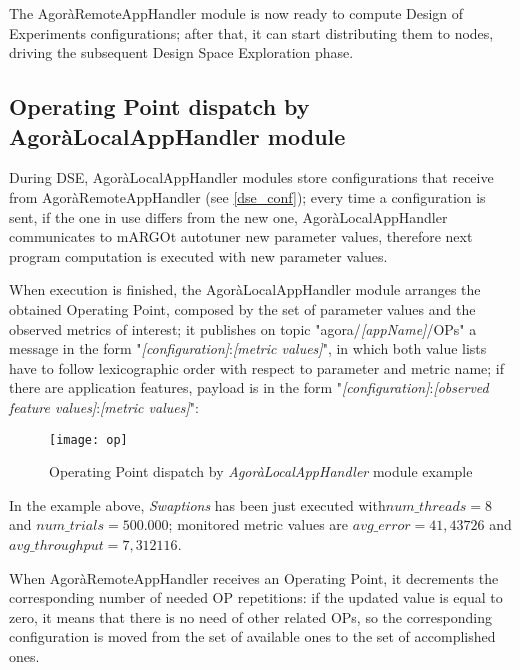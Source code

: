 The AgoràRemoteAppHandler module is now ready to compute Design of Experiments configurations; after that, it can start distributing them to nodes, driving the subsequent Design Space Exploration phase.





\subsection{Operating Point dispatch by AgoràLocalAppHandler module}\label{opSend}

During DSE, AgoràLocalAppHandler modules store configurations that receive from AgoràRemoteAppHandler (see \ref{dse_conf}); every time a configuration is sent, if the one in use differs from the new one, AgoràLocalAppHandler communicates to mARGOt autotuner new parameter values, therefore next program computation is executed with new parameter values.

When execution is finished, the AgoràLocalAppHandler module arranges the obtained Operating Point, composed by the set of parameter values and the observed metrics of interest; it publishes on topic "agora/\textit{[appName]}/OPs" a message in the form "\textit{[configuration]}:\textit{[metric values]}", in which both value lists have to follow lexicographic order with respect to parameter and metric name; if there are application features, payload is in the form "\textit{[configuration]}:\textit{[ob\-served feature values]}:\textit{[metric values]}":

\begin{figure}[H]

    \centering
    \texttt{[image: op]}
    \caption{Operating Point dispatch by \textit{AgoràLocalAppHandler} module example}
    \label{fig:op}
    
\end{figure}

In the example above, \textit{Swaptions} has been just executed with\linebreak $num\_threads = 8$ and $num\_trials = 500.000$; monitored metric values are $avg\_error = 41,43726$ and $avg\_throughput = 7,312116$.

When AgoràRemoteAppHandler receives an Operating Point, it decrements the corresponding number of needed OP repetitions: if the updated value is equal to zero, it means that there is no need of other related OPs, so the corresponding configuration is moved from the set of available ones to the set of accomplished ones.

